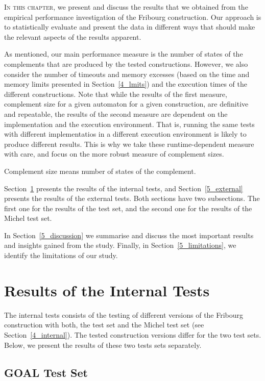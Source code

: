 \lettrine{I}{n this chapter}, we present and discuss the results that we obtained from the empirical performance investigation of the Fribourg construction. Our approach is to statistically evaluate and present the data in different ways that should make the relevant aspects of the results apparent. 

As mentioned, our main performance measure is the number of states of the complements that are produced by the tested constructions. However, we also consider the number of timeouts and memory excesses (based on the time and memory limits presented in Section~\ref{4_lmits}) and the execution times of the different constructions. Note that while the results of the first measure, complement size for a given automaton for a given construction, are definitive and repeatable, the results of the second measure are dependent on the implementation and the execution environment. That is, running the same tests with different implementatios in a different execution environment is likely to produce different results. This is why we take these runtime-dependent measure with care, and focus on the more robust measure of complement sizes.

Complement size means number of states of the complement.


Section~\ref{5_internal} presents the results of the internal tests, and Section~\ref{5_external} presents the results of the external tests. Both sections have two subsections. The first one for the results of the \goal{} test set, and the second one for the results of the Michel test set.

In Section~\ref{5_discussion} we summarise and discuss the most important results and insights gained from the study. Finally, in Section~\ref{5_limitations}, we identify the limitations of our study.


\section{Results of the Internal Tests}
\label{5_internal}
The internal tests consists of the testing of different versions of the Fribourg construction with both, the \goal{} test set and the Michel test set (see Section~\ref{4_internal}). The tested construction versions differ for the two test sets. Below, we present the results of these two tests sets separately.

\subsection{GOAL Test Set}
\label{5_internal_goal}

